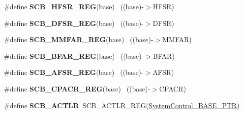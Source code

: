 \begin{DoxyCompactItemize}
\item 
\hypertarget{group___s_c_b___register___accessor___macros_ga82f9f02807dd20f1f97226fcbeb5771e}{}\#define {\bfseries S\+C\+B\+\_\+\+H\+F\+S\+R\+\_\+\+R\+E\+G}(base)                                          ~((base)-\/$>$H\+F\+S\+R)\label{group___s_c_b___register___accessor___macros_ga82f9f02807dd20f1f97226fcbeb5771e}

\item 
\hypertarget{group___s_c_b___register___accessor___macros_ga2ac45bf07176acb69b71189cddba46dc}{}\#define {\bfseries S\+C\+B\+\_\+\+D\+F\+S\+R\+\_\+\+R\+E\+G}(base)                                          ~((base)-\/$>$D\+F\+S\+R)\label{group___s_c_b___register___accessor___macros_ga2ac45bf07176acb69b71189cddba46dc}

\item 
\hypertarget{group___s_c_b___register___accessor___macros_gafbf4831267e040e9b4710ae9fb63c2c9}{}\#define {\bfseries S\+C\+B\+\_\+\+M\+M\+F\+A\+R\+\_\+\+R\+E\+G}(base)                                        ~((base)-\/$>$M\+M\+F\+A\+R)\label{group___s_c_b___register___accessor___macros_gafbf4831267e040e9b4710ae9fb63c2c9}

\item 
\hypertarget{group___s_c_b___register___accessor___macros_ga9932d2c86e9f7cd72b4fbca18863e757}{}\#define {\bfseries S\+C\+B\+\_\+\+B\+F\+A\+R\+\_\+\+R\+E\+G}(base)                                          ~((base)-\/$>$B\+F\+A\+R)\label{group___s_c_b___register___accessor___macros_ga9932d2c86e9f7cd72b4fbca18863e757}

\item 
\hypertarget{group___s_c_b___register___accessor___macros_ga9835a953f824d051f48ab361ba7ec70c}{}\#define {\bfseries S\+C\+B\+\_\+\+A\+F\+S\+R\+\_\+\+R\+E\+G}(base)                                          ~((base)-\/$>$A\+F\+S\+R)\label{group___s_c_b___register___accessor___macros_ga9835a953f824d051f48ab361ba7ec70c}

\item 
\hypertarget{group___s_c_b___register___accessor___macros_gacfd983b590ea921090d31cc94050c795}{}\#define {\bfseries S\+C\+B\+\_\+\+C\+P\+A\+C\+R\+\_\+\+R\+E\+G}(base)                                        ~((base)-\/$>$C\+P\+A\+C\+R)\label{group___s_c_b___register___accessor___macros_gacfd983b590ea921090d31cc94050c795}

\item 
\hypertarget{group___s_c_b___register___accessor___macros_ga2a94c61032c2b326d148f402585f66f4}{}\#define {\bfseries S\+C\+B\+\_\+\+A\+C\+T\+L\+R}~S\+C\+B\+\_\+\+A\+C\+T\+L\+R\+\_\+\+R\+E\+G(\hyperlink{group___s_c_b___peripheral_gaf22864785770f832103e904244e078cb}{System\+Control\+\_\+\+B\+A\+S\+E\+\_\+\+P\+T\+R})\label{group___s_c_b___register___accessor___macros_ga2a94c61032c2b326d148f402585f66f4}


\end{DoxyCompactItemize}
